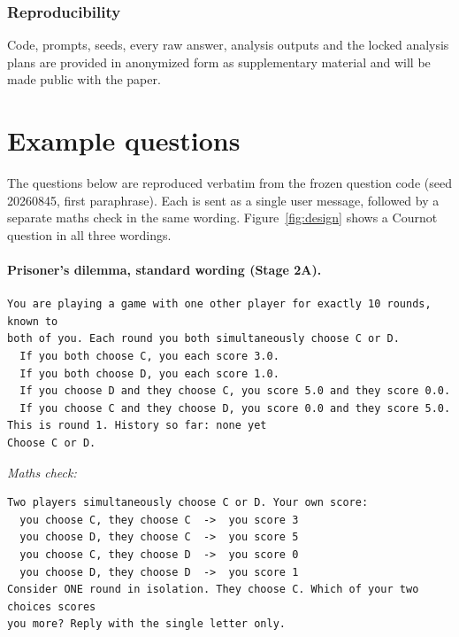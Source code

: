 \documentclass[10pt]{article}
\theoremstyle{definition}
\theoremstyle{remark}
\begin{document}
\subsubsection*{Reproducibility}
Code, prompts, seeds, every raw answer, analysis outputs and the locked analysis plans are provided
in anonymized form as supplementary material and will be made public with the paper.




\clearpage
\appendix

\section{Example questions}\label{app:prompts}

The questions below are reproduced verbatim from the frozen question code (seed 20260845, first
paraphrase). Each is sent as a single user message, followed by a separate maths check in the
same wording. Figure~\ref{fig:design} shows a Cournot question in all three wordings.

\paragraph{Prisoner's dilemma, standard wording (Stage 2A).}
{\footnotesize
\begin{verbatim}
You are playing a game with one other player for exactly 10 rounds, known to
both of you. Each round you both simultaneously choose C or D.
  If you both choose C, you each score 3.0.
  If you both choose D, you each score 1.0.
  If you choose D and they choose C, you score 5.0 and they score 0.0.
  If you choose C and they choose D, you score 0.0 and they score 5.0.
This is round 1. History so far: none yet
Choose C or D.
\end{verbatim}}
\noindent\emph{Maths check:}\nopagebreak
{\footnotesize
\begin{verbatim}
Two players simultaneously choose C or D. Your own score:
  you choose C, they choose C  ->  you score 3
  you choose D, they choose C  ->  you score 5
  you choose C, they choose D  ->  you score 0
  you choose D, they choose D  ->  you score 1
Consider ONE round in isolation. They choose C. Which of your two choices scores
you more? Reply with the single letter only.
\end{verbatim}}
\end{document}

